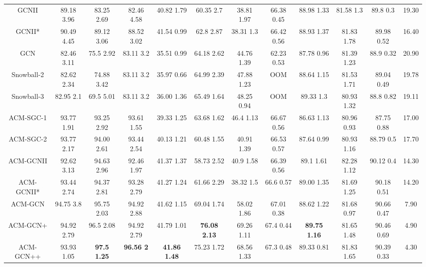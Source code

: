 \documentclass{article}
\newcommand{\0}{{\boldsymbol{0}}}
\newcommand{\6}{{\partial}}
\newcommand{\8}{{\infty}}
\newcommand{\4}{{\nabla}}
\begin{document}
\begin{table}[htbp]
\begin{tabular}{c|cccccccccc|c}
    GCNII & 89.18  3.96 & 83.25  2.69 & 82.46  4.58 & 40.82  1.79 & 60.35  2.7 & 38.81  1.97 & 66.38  0.45 & 88.98  1.33 & 81.58  1.3 & 89.8  0.3 & 19.30 \\
    GCNII* & 90.49  4.45 & 89.12  3.06 & 88.52  3.02 & 41.54  0.99 & 62.8  2.87 & 38.31  1.3 & 66.42  0.56 & 88.93  1.37 & 81.83  1.78 & 89.98  0.52 & 16.40 \\
    GCN   & 82.46  3.11 & 75.5  2.92 & 83.11  3.2 & 35.51  0.99 & 64.18  2.62 & 44.76  1.39 & 62.23  0.53 & 87.78  0.96 & 81.39  1.23 & 88.9  0.32 & 20.90 \\
    Snowball-2 & 82.62  2.34 & 74.88  3.42 & 83.11  3.2 & 35.97  0.66 & 64.99  2.39 & 47.88  1.23 & OOM   & 88.64  1.15 & 81.53  1.71 & 89.04  0.49 & 19.78 \\
    Snowball-3 & 82.95  2.1 & 69.5  5.01 & 83.11  3.2 & 36.00  1.36 & 65.49  1.64 & 48.25  0.94 & OOM   & 89.33  1.3 & 80.93  1.32 & 88.8  0.82 & 19.11 \\
    \midrule
    ACM-SGC-1 & 93.77  1.91 & 93.25  2.92 & 93.61  1.55 & 39.33  1.25 & 63.68  1.62 & 46.4  1.13 & 66.67  0.56 & 86.63  1.13 & 80.96  0.93 & 87.75  0.88 & 17.00 \\
    ACM-SGC-2 & 93.77  2.17 & 94.00  2.61 & 93.44  2.54 & 40.13  1.21 & 60.48  1.55 & 40.91  1.39 & 66.53  0.57 & 87.64  0.99 & 80.93  1.16 & 88.79  0.5 & 17.70 \\
    ACM-GCNII & 92.62  3.13 & 94.63  2.96 & 92.46  1.97 & 41.37  1.37 & 58.73  2.52 & 40.9  1.58 & 66.39  0.56 & 89.1  1.61 & 82.28  1.12 & 90.12  0.4 & 14.30 \\
    ACM-GCNII* & 93.44  2.74 & 94.37  2.81 & 93.28  2.79 & 41.27  1.24 & 61.66  2.29 & 38.32  1.5 & 66.6  0.57 & 89.00  1.35 & 81.69  1.25 & 90.18  0.51 & 14.20 \\
    ACM-GCN & 94.75  3.8 & 95.75  2.03 & 94.92  2.88 & 41.62  1.15 & 69.04  1.74 & 58.02  1.86 & 67.01  0.38 & 88.62  1.22 & 81.68  0.97 & 90.66  0.47 & 7.90 \\
    ACM-GCN+ & 94.92  2.79 & 96.5  2.08 & 94.92  2.79 & 41.79  1.01 & \cellcolor[rgb]{ .816,  .808,  .808}\textbf{76.08  2.13} & 69.26  1.11 & 67.4  0.44 & \cellcolor[rgb]{ .816,  .808,  .808}\textbf{89.75  1.16} & 81.65  1.48 & 90.46  0.69 & 4.90 \\
    ACM-GCN++ & 93.93  1.05 & \cellcolor[rgb]{ .816,  .808,  .808}\textbf{97.5  1.25} & \cellcolor[rgb]{ .816,  .808,  .808}\textbf{96.56  2} & \cellcolor[rgb]{ .816,  .808,  .808}\textbf{41.86  1.48} & 75.23  1.72 & 68.56  1.33 & 67.3  0.48 & 89.33  0.81 & 81.83  1.65 & 90.39  0.33 & 4.30 \\

\end{tabular}
\end{table}
\end{document}
